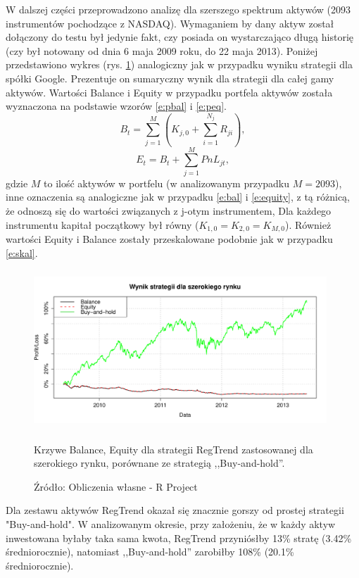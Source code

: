 \documentclass[man,mfu]{mgrwms}
\begin{document}
W dalszej części przeprowadzono analizę dla szerszego spektrum aktywów (2093 instrumentów pochodzące z NASDAQ). Wymaganiem by dany aktyw został dołączony do testu był jedynie fakt, czy posiada on wystarczająco długą historię (czy był notowany od dnia 6 maja 2009 roku, do 22 maja 2013). Poniżej przedstawiono wykres (rys. \ref{fig:allmarket})  analogiczny jak w przypadku wyniku strategii dla spółki Google. Prezentuje on sumaryczny wynik dla strategii dla całej gamy aktywów. Wartości Balance i Equity w przypadku portfela aktywów została wyznaczona na podstawie wzorów \ref{e:pbal} i \ref{e:peq}.
\begin{equation}\label{e:pbal}
B_t = \sum_{j = 1}^M(K_{j,0} + \sum_{i=1}^{N_j}R_{ji}),
\end{equation}
\begin{equation}\label{e:peq}
E_t = B_t + \sum_{j = 1}^MPnL_{jt},
\end{equation}
gdzie $M$ to ilość aktywów w portfelu (w analizowanym przypadku $M=2093$), inne oznaczenia są analogiczne jak w przypadku \ref{e:bal} i \ref{e:equity}, z tą różnicą, że odnoszą się do wartości związanych z j-otym instrumentem, Dla każdego instrumentu kapitał początkowy był równy ($K_{1,0}=K_{2,0}=K_{M,0}$). Również wartości Equity i Balance zostały przeskalowane podobnie jak w przypadku \ref{e:skal}.
\begin{figure}[H]
\centering
\vspace{-10pt}
\includegraphics[width=110mm,height = 60mm]{allmarket}
\vspace{-10pt}
\caption{Krzywe Balance, Equity dla strategii RegTrend zastosowanej dla szerokiego rynku, porównane ze strategią ,,Buy-and-hold''.}\vspace{-12pt}
\caption*{Źródło: Obliczenia własne - R Project}
\label{fig:allmarket}\vspace{-12pt}
\end{figure}

Dla zestawu aktywów RegTrend okazał się znacznie gorszy od prostej strategii "Buy-and-hold". W analizowanym okresie, przy założeniu, że w każdy aktyw inwestowana byłaby taka sama kwota, RegTrend przyniósłby 13\% stratę (3.42\% średniorocznie), natomiast ,,Buy-and-hold'' zarobiłby 108\% (20.1\% średniorocznie).
\end{document}
